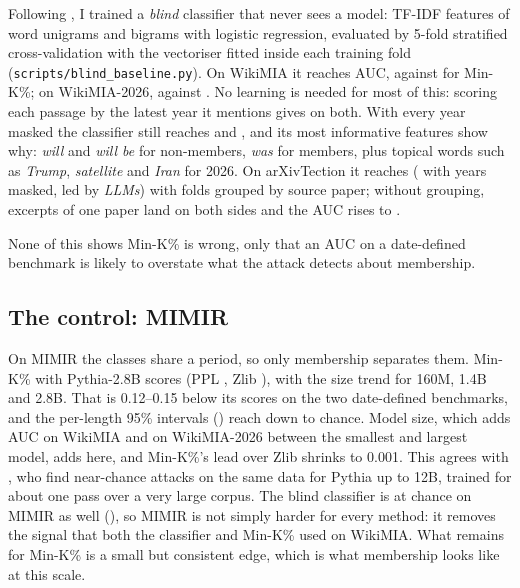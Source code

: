 \documentclass[11pt]{article}
\begin{document}
Following \citet{das2024blind}, I trained a \emph{blind} classifier that never sees a model: TF-IDF features of word unigrams and bigrams with logistic regression, evaluated by 5-fold stratified cross-validation with the vectoriser fitted inside each training fold (\texttt{scripts/blind\_baseline.py}). On WikiMIA it reaches \BlindWikiRaw{} AUC, against \RepMinK{} for Min-K\%; on WikiMIA-2026, \BlindNewRaw{} against \NewMinK{}. No learning is needed for most of this: scoring each passage by the latest year it mentions gives \BlindWikiYear{} on both. With every year masked the classifier still reaches \BlindWikiNoyr{} and \BlindNewNoyr{}, and its most informative features show why: \emph{will} and \emph{will be} for non-members, \emph{was} for members, plus topical words such as \emph{Trump}, \emph{satellite} and \emph{Iran} for 2026. On arXivTection it reaches \BlindArxRaw{} (\BlindArxNoyr{} with years masked, led by \emph{LLMs}) with folds grouped by source paper; without grouping, excerpts of one paper land on both sides and the AUC rises to \BlindArxLeaky{}.

None of this shows Min-K\% is wrong, only that an AUC on a date-defined benchmark is likely to overstate what the attack detects about membership.

\subsection{The control: MIMIR}
\label{sec:mimirres}

On MIMIR the classes share a period, so only membership separates them. Min-K\% with Pythia-2.8B scores \MimirMinK{} (PPL \MimirPPL{}, Zlib \MimirZlib{}), with the size trend \MimirSizeTrend{} for 160M, 1.4B and 2.8B. That is 0.12--0.15 below its scores on the two date-defined benchmarks, and the per-length 95\% intervals (\MimirCI{}) reach down to chance. Model size, which adds \RepSizeGain{} AUC on WikiMIA and \NewSizeGain{} on WikiMIA-2026 between the smallest and largest model, adds \MimirSizeGain{} here, and Min-K\%'s lead over Zlib shrinks to 0.001. This agrees with \citet{duan2024membership}, who find near-chance attacks on the same data for Pythia up to 12B, trained for about one pass over a very large corpus. The blind classifier is at chance on MIMIR as well (\BlindMimirRange{}), so MIMIR is not simply harder for every method: it removes the signal that both the classifier and Min-K\% used on WikiMIA. What remains for Min-K\% is a small but consistent edge, which is what membership looks like at this scale.
\end{document}

